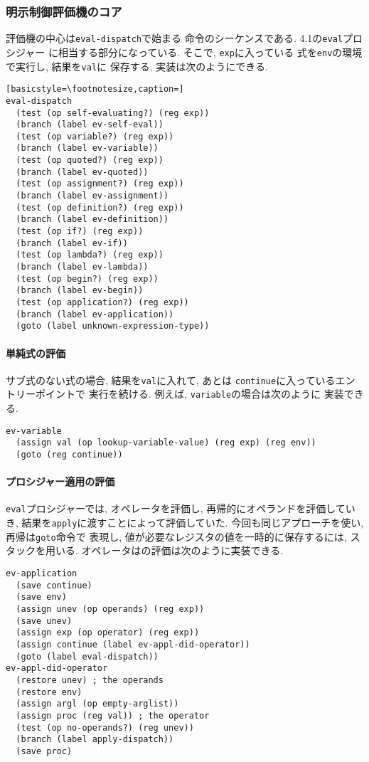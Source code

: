 \subsubsection{明示制御評価機のコア}
評価機の中心は\lstinline{eval-dispatch}で始まる%
命令のシーケンスである. 4.1の\lstinline{eval}プロシジャー%
に相当する部分になっている. そこで, \lstinline{exp}に入っている%
式を\lstinline{env}の環境で実行し, 結果を\lstinline{val}に%
保存する. 実装は次のようにできる.

\begin{lstlisting}[basicstyle=\footnotesize,caption=]
eval-dispatch
  (test (op self-evaluating?) (reg exp))
  (branch (label ev-self-eval))
  (test (op variable?) (reg exp))
  (branch (label ev-variable))
  (test (op quoted?) (reg exp))
  (branch (label ev-quoted))
  (test (op assignment?) (reg exp))
  (branch (label ev-assignment))
  (test (op definition?) (reg exp))
  (branch (label ev-definition))
  (test (op if?) (reg exp))
  (branch (label ev-if))
  (test (op lambda?) (reg exp))
  (branch (label ev-lambda))
  (test (op begin?) (reg exp))
  (branch (label ev-begin))
  (test (op application?) (reg exp))
  (branch (label ev-application))
  (goto (label unknown-expression-type))
\end{lstlisting}

\paragraph{単純式の評価}
サブ式のない式の場合, 結果を\lstinline{val}に入れて, あとは%
\lstinline{continue}に入っているエントリーポイントで%
実行を続ける. 例えば, \lstinline{variable}の場合は次のように%
実装できる.

\begin{lstlisting}[basicstyle=\footnotesize]
ev-variable
  (assign val (op lookup-variable-value) (reg exp) (reg env))
  (goto (reg continue))
\end{lstlisting}
%
\paragraph{プロシジャー適用の評価}
\lstinline{eval}プロシジャーでは, オペレータを評価し,
再帰的にオペランドを評価していき,
結果を\lstinline{apply}に渡すことによって評価していた.
今回も同じアプローチを使い, 再帰は\lstinline{goto}命令で
表現し, 値が必要なレジスタの値を一時的に保存するには, スタックを用いる.
オペレータはの評価は次のように実装できる.

\begin{lstlisting}[basicstyle=\footnotesize]
ev-application
  (save continue)
  (save env)
  (assign unev (op operands) (reg exp))
  (save unev)
  (assign exp (op operator) (reg exp))
  (assign continue (label ev-appl-did-operator))
  (goto (label eval-dispatch))
ev-appl-did-operator
  (restore unev) ; the operands
  (restore env)
  (assign argl (op empty-arglist))
  (assign proc (reg val)) ; the operator
  (test (op no-operands?) (reg unev))
  (branch (label apply-dispatch))
  (save proc)
\end{lstlisting}
